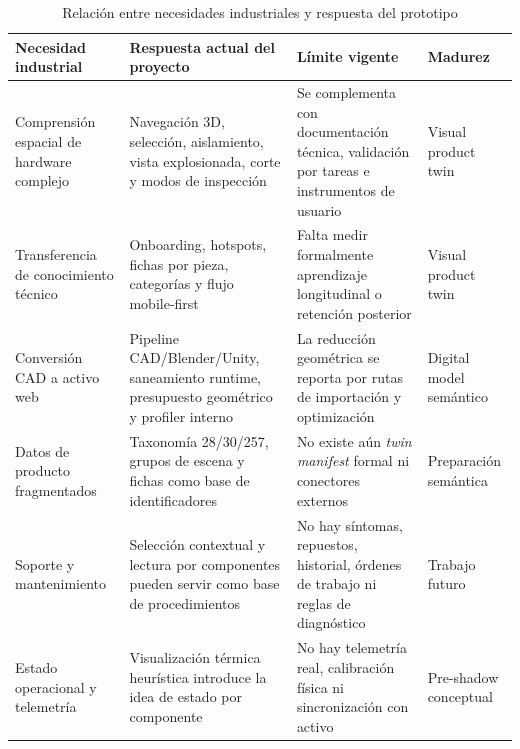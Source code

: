 \begin{table}[H]
    \caption{Relación entre necesidades industriales y respuesta del prototipo}
    \label{tab:necesidades_industriales_respuesta_prototipo}
    \centering
    \scriptsize
    \begin{tabular}{p{3.3cm}p{5.1cm}p{4.0cm}p{2.1cm}}
        \hline
        \textbf{Necesidad industrial} & \textbf{Respuesta actual del proyecto} & \textbf{Límite vigente} & \textbf{Madurez} \\ \hline
        Comprensión espacial de hardware complejo & Navegación 3D, selección, aislamiento, vista explosionada, corte y modos de inspección & Se complementa con documentación técnica, validación por tareas e instrumentos de usuario & Visual product twin \\
        Transferencia de conocimiento técnico & Onboarding, hotspots, fichas por pieza, categorías y flujo mobile-first & Falta medir formalmente aprendizaje longitudinal o retención posterior & Visual product twin \\
        Conversión CAD a activo web & Pipeline CAD/Blender/Unity, saneamiento runtime, presupuesto geométrico y profiler interno & La reducción geométrica se reporta por rutas de importación y optimización & Digital model semántico \\
        Datos de producto fragmentados & Taxonomía 28/30/257, grupos de escena y fichas como base de identificadores & No existe aún \textit{twin manifest} formal ni conectores externos & Preparación semántica \\
        Soporte y mantenimiento & Selección contextual y lectura por componentes pueden servir como base de procedimientos & No hay síntomas, repuestos, historial, órdenes de trabajo ni reglas de diagnóstico & Trabajo futuro \\
        Estado operacional y telemetría & Visualización térmica heurística introduce la idea de estado por componente & No hay telemetría real, calibración física ni sincronización con activo & Pre-shadow conceptual \\ \hline
    \end{tabular}
    \par\vspace{0.5\baselineskip}
\end{table}

